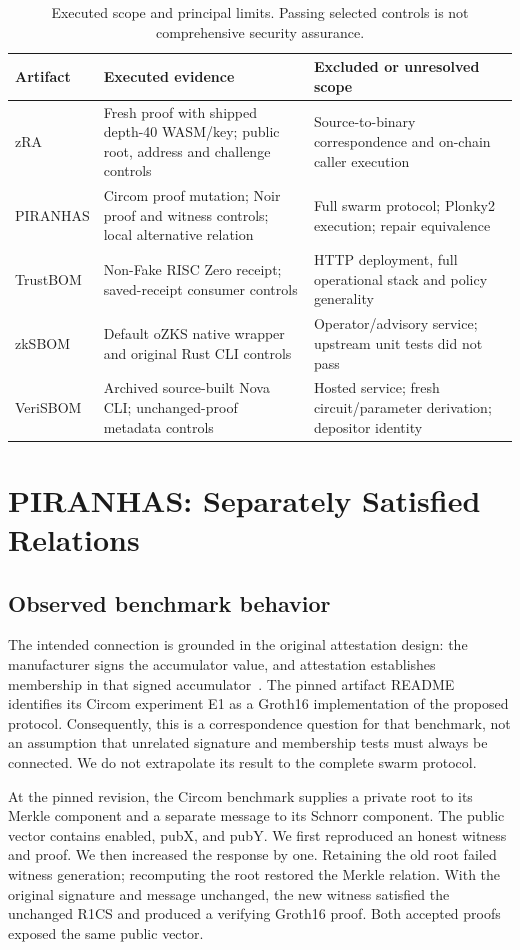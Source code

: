 \documentclass[sigconf,nonacm]{acmart}
\begin{document}
\begin{table}[t]
\caption{Executed scope and principal limits. Passing selected controls is not comprehensive security assurance.}
\label{tab:corpus}
\small
\begin{tabularx}{\textwidth}{@{}lXX@{}}
\toprule Artifact & Executed evidence & Excluded or unresolved scope \\
\midrule
zRA & Fresh proof with shipped depth-40 WASM/key; public root, address and challenge controls & Source-to-binary correspondence and on-chain caller execution \\
PIRANHAS & Circom proof mutation; Noir proof and witness controls; local alternative relation & Full swarm protocol; Plonky2 execution; repair equivalence \\
TrustBOM & Non-Fake RISC Zero receipt; saved-receipt consumer controls & HTTP deployment, full operational stack and policy generality \\
zkSBOM & Default oZKS native wrapper and original Rust CLI controls & Operator/advisory service; upstream unit tests did not pass \\
VeriSBOM & Archived source-built Nova CLI; unchanged-proof metadata controls & Hosted service; fresh circuit/parameter derivation; depositor identity \\
\bottomrule
\end{tabularx}
\end{table}

\section{PIRANHAS: Separately Satisfied Relations}
\subsection{Observed benchmark behavior}
The intended connection is grounded in the original attestation design: the manufacturer signs the accumulator value, and attestation establishes membership in that signed accumulator~\cite{piranhas}. The pinned artifact README identifies its Circom experiment E1 as a Groth16 implementation of the proposed protocol. Consequently, this is a correspondence question for that benchmark, not an assumption that unrelated signature and membership tests must always be connected. We do not extrapolate its result to the complete swarm protocol.

At the pinned revision, the Circom benchmark supplies a private root to its Merkle component and a separate message to its Schnorr component. The public vector contains enabled, pubX, and pubY. We first reproduced an honest witness and proof. We then increased the response by one. Retaining the old root failed witness generation; recomputing the root restored the Merkle relation. With the original signature and message unchanged, the new witness satisfied the unchanged R1CS and produced a verifying Groth16 proof. Both accepted proofs exposed the same public vector.
\end{document}
